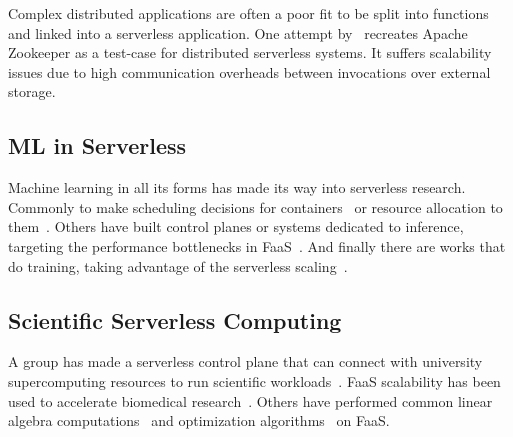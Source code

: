 Complex distributed applications are often a poor fit to be split into functions and linked into a serverless application.
One attempt by~\cite{copik2022faaskeeper} recreates Apache Zookeeper as a test-case for distributed serverless systems. 
It suffers scalability issues due to high communication overheads between invocations over external storage.

\subsection{ML in Serverless}
\label{sec:serverless-ai}

Machine learning in all its forms has made its way into serverless research.
Commonly to make scheduling decisions for containers~\cite{balaji2021fireplace} or resource allocation to them~\cite{mvondo2021ofc,eismann2021sizeless}.
Others have built control planes or systems dedicated to inference, targeting the performance bottlenecks in FaaS~\cite{yang2022infless, ali2022optimizing}.
And finally there are works that do training, taking advantage of the serverless scaling~\cite{wang2019distributed, gimeno2022mlless, xu2021lambdadnn}.


\subsection{Scientific Serverless Computing}

A group has made a serverless control plane that can connect with university supercomputing resources to run scientific workloads~\cite{funcx_hpdc_20}.
FaaS scalability has been used to accelerate biomedical research~\cite{kumanov2018serverless,hung2019rapid}.
Others have performed common linear algebra computations~\cite{werner2018serverless,shankar2020serverless} and optimization algorithms~\cite{aytekin2019harnessing} on FaaS.
